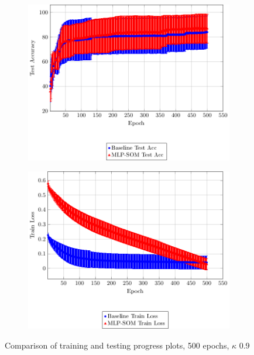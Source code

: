 \begin{figure}[h!]
     \centering
     \begin{subfigure}[b]{0.49\textwidth}
         \centering
         \includegraphics[width=\textwidth]{figs/baseline-model-tr-test-metrices-500-test.pdf}
     \end{subfigure}
     \hfill
     \begin{subfigure}[b]{0.49\textwidth}
         \centering
         \includegraphics[width=\textwidth]{figs/baseline-model-tr-test-metrices-500-tr.pdf}
     \end{subfigure}
        \caption{Comparison of training and testing progress plots, 500 epochs, $\kappa$ 0.9}
        \label{exp2-graphs}
\end{figure}

